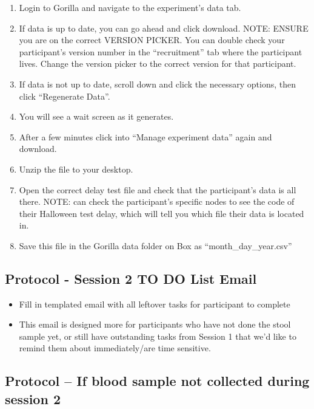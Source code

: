 \documentclass[]{book}
\begin{document}
\begin{enumerate}
\def\labelenumi{\arabic{enumi}.}
\item
  Login to Gorilla and navigate to the experiment's data tab.
\item
  If data is up to date, you can go ahead and click download. NOTE: ENSURE you are on the correct VERSION PICKER. You can double check your participant's version number in the ``recruitment'' tab where the participant lives. Change the version picker to the correct version for that participant.
\item
  If data is not up to date, scroll down and click the necessary options, then click ``Regenerate Data''.
\item
  You will see a wait screen as it generates.
\item
  After a few minutes click into ``Manage experiment data'' again and download.
\item
  Unzip the file to your desktop.
\item
  Open the correct delay test file and check that the participant's data is all there. NOTE: can check the participant's specific nodes to see the code of their Halloween test delay, which will tell you which file their data is located in.
\item
  Save this file in the Gorilla data folder on Box as ``month\_day\_year.csv''
\end{enumerate}

\hypertarget{protocol---session-2-to-do-list-email-1}{%
\subsection{Protocol - Session 2 TO DO List Email}\label{protocol---session-2-to-do-list-email-1}}

\begin{itemize}
\item
  Fill in templated email with all leftover tasks for participant to complete
\item
  This email is designed more for participants who have not done the stool sample yet, or still have outstanding tasks from Session 1 that we'd like to remind them about immediately/are time sensitive.
\end{itemize}

\hypertarget{protocol-if-blood-sample-not-collected-during-session-2}{%
\subsection{Protocol -- If blood sample not collected during session 2}\label{protocol-if-blood-sample-not-collected-during-session-2}}
\end{document}
